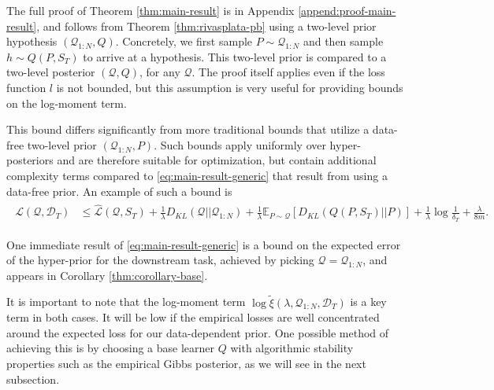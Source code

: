 \documentclass{article} %
\theoremstyle{definition}
\newcommand{\Expect}[2]{\mathbb{E}_{#1}\left [#2 \right ]}
\begin{document}
The full proof of Theorem \ref{thm:main-result} is in Appendix \ref{append:proof-main-result}, and follows from Theorem \ref{thm:rivasplata-pb} using a two-level prior hypothesis $(\mathcal{Q}_{1:N}, Q)$. Concretely, we first sample $P\sim \mathcal{Q}_{1:N}$ and then sample $h\sim Q(P, S_T)$ to arrive at a hypothesis. This two-level prior is compared to a two-level posterior $(\mathcal{Q}, Q)$, for any $\mathcal{Q}$. The proof itself applies even if the loss function $l$ is not bounded, but this assumption is very useful for providing bounds on the log-moment term.

This bound differs significantly from more traditional bounds that utilize a data-free two-level prior $(\mathcal{Q}_{1:N}, P)$. Such bounds apply uniformly over hyper-posteriors and are therefore suitable for optimization, but contain additional complexity terms compared to \eqref{eq:main-result-generic} that result from using a data-free prior. An example of such a bound is
%
\begin{align} \label{eq:main-result-generic-datafree}
\begin{split}
\mathcal{L}(\mathcal{Q}, \mathcal{D}_T) &\leq \hat{\mathcal{L}}(\mathcal{Q}, S_T) 
+ \frac{1}{\lambda}D_{KL}(\mathcal{Q}||\mathcal{Q}_{1:N}) 
+ \frac{1}{\lambda}\Expect{P\sim \mathcal{Q}}{D_{KL}(Q(P,S_T)||P)}
+\frac{1}{\lambda}\log\frac{1}{\delta_T}+\frac{\lambda}{8m} .
\end{split}
\end{align}


One immediate result of \eqref{eq:main-result-generic} is a bound on the expected error of the hyper-prior for the downstream task, achieved by picking $\mathcal{Q}=\mathcal{Q}_{1:N}$, and appears in Corollary \ref{thm:corollary-base}.

It is important to note that the log-moment term $\log\tilde{\xi}(\lambda,\mathcal{Q}_{1:N},\mathcal{D}_T)$ is a key term in both cases. It will be low if the empirical losses are well concentrated around the expected loss for our data-dependent prior. One possible method of achieving this is by choosing a base learner $Q$ with algorithmic stability properties such as the empirical Gibbs posterior, as we will see in the next subsection.
\end{document}
